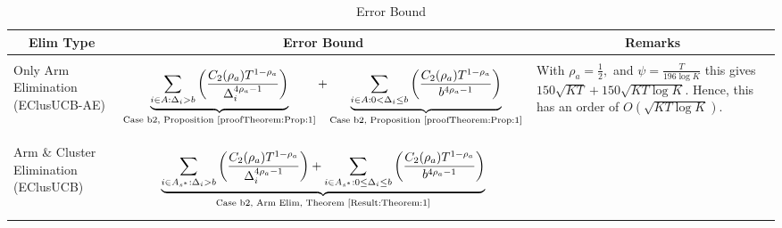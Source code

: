 \begin{table}
\caption{Error Bound}
\label{App:E:table:3}
\begin{center}
\begin{tabular}{p{1.4cm}p{10.3cm}p{3.5cm}}
\multicolumn{1}{c}{\bf Elim Type} &\multicolumn{1}{c}{\bf Error Bound} &\multicolumn{1}{c}{\bf Remarks} \\
\hline \\
Only Arm Elimination (EClusUCB-AE)	& \begin{align*}\underbrace{\sum_{i\in A:\Delta_{i} > b}\bigg(\dfrac{C_{2}(\rho_{a})T^{1-\rho_{a}}}{\Delta_{i}^{4\rho_{a} -1}} \bigg)}_{\text{Case b2, Proposition \ref{proofTheorem:Prop:1}}} + \underbrace{\sum_{i\in A:0 < \Delta_{i}\leq b}\bigg( \dfrac{C_{2}(\rho_{a})T^{1-\rho_{a}}}{b^{4\rho_{a} -1}} \bigg)}_{\text{Case b2, Proposition \ref{proofTheorem:Prop:1}}}\end{align*}  & With $\rho_{a}=\frac{1}{2},$ and $\psi=\frac{T}{196 \log K}$ this gives $150\sqrt{KT}+150\sqrt{KT\log K}$. Hence, this has an order of $O(\sqrt{KT\log K})$.\\
\hline\\
Arm \& Cluster Elimination (EClusUCB) 	& \begin{align*}  \underbrace{\sum_{i\in A_{s^{*}}:\Delta_{i} > b}\bigg(\dfrac{C_{2}(\rho_{a})T^{1-\rho_{a}}}{\Delta_{i}^{4\rho_{a}-1}} \bigg)+ \sum_{i\in A_{s^{*}}:0\leq\Delta_{i}\leq b}\bigg(\dfrac{C_{2}(\rho_{a})T^{1-\rho_{a}}}{b^{4\rho_{a} -1}} \bigg)}_{\text{Case b2, Arm Elim, Theorem \ref{Result:Theorem:1}}}\\   

\end{align*}
\end{tabular}
\end{center}
\end{table}
